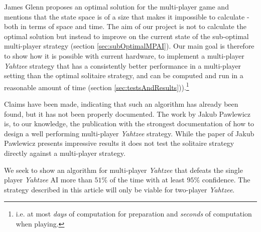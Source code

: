 James Glenn proposes an optimal solution for the multi-player game and mentions that the state space is of a size that makes it impossible to calculate - both in terms of space and time.
The aim of our project is not to calculate the optimal solution but instead to improve on the current state of the sub-optimal multi-player strategy  (section \ref{sec:subOptimalMPAI}). 
Our main goal is therefore to show how it is possible with current hardware, to implement a multi-player \emph{Yahtzee} strategy that has a consistently better performance in a multi-player setting than the optimal solitaire strategy, and can be computed and run in a reasonable amount of time (section \ref{sec:testsAndResults})).\footnote{i.e. at most \emph{days} of computation for preparation and \emph{seconds} of computation when playing.}

Claims have been made, indicating that such an algorithm has already been found, but it has not been properly documented.
The work by Jakub Pawlewicz is, to our knowledge, the publication with the strongest documentation of how to design a well performing multi-player \emph{Yahtzee} strategy.
While the paper of Jakub Pawlewicz\citep{pawlewicz2011nearly} presents impressive results it does not test the solitaire strategy directly against a multi-player strategy.

We seek to show an algorithm for multi-player \emph{Yahtzee} that defeats the single player \emph{Yahtzee} AI more than $51\%$ of the time with at least $95\%$ confidence.
The strategy described in this article will only be viable for two-player \emph{Yahtzee}.

%


